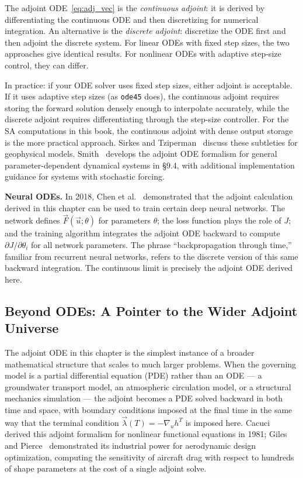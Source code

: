 The adjoint ODE~\eqref{eq:adj_vec} is the \emph{continuous adjoint}:
it is derived by differentiating the continuous ODE and then discretizing
for numerical integration. An alternative is the \emph{discrete adjoint}:
discretize the ODE first and then adjoint the discrete system.
For linear ODEs with fixed step sizes, the two approaches give
identical results. For nonlinear ODEs with adaptive step-size control,
they can differ.

In practice: if your ODE solver uses fixed step sizes, either adjoint
is acceptable. If it uses adaptive step sizes (as \texttt{ode45} does),
the continuous adjoint requires storing the forward solution densely
enough to interpolate accurately, while the discrete adjoint requires
differentiating through the step-size controller.
For the SA computations in this book, the continuous adjoint with
dense output storage is the more practical approach.
Sirkes and Tziperman~\cite{sirkes1997finite} discuss these subtleties
for geophysical models. Smith~\cite{smith2014uncertainty} develops the
adjoint ODE formalism for general parameter-dependent dynamical systems
in \S9.4, with additional implementation guidance for systems with
stochastic forcing.

\medskip
\noindent\textbf{Neural ODEs.}
In 2018, Chen et al.~\cite{chen2018neural} demonstrated that
the adjoint calculation derived in this chapter can be used to train
certain deep neural networks. The network defines $\vec{F}(\vec{u};\theta)$
for parameters $\theta$; the loss function plays the role of $J$;
and the training algorithm integrates the adjoint ODE backward
to compute $\partial J/\partial\theta_i$ for all network parameters.
The phrase ``backpropagation through time,'' familiar from recurrent
neural networks, refers to the discrete version of this same
backward integration. The continuous limit is precisely the adjoint
ODE derived here.

\subsection*{Beyond ODEs: A Pointer to the Wider Adjoint Universe}

The adjoint ODE in this chapter is the simplest instance of a
broader mathematical structure that scales to much larger problems.
When the governing model is a partial differential equation (PDE)
rather than an ODE --- a groundwater transport model, an atmospheric
circulation model, or a structural mechanics simulation --- the
adjoint becomes a PDE solved backward in both time and space,
with boundary conditions imposed at the final time in the same way
that the terminal condition $\vec{\lambda}(T) = -\nabla_u h^T$ is
imposed here.
Cacuci~\cite{cacuci1981sensitivity} derived this adjoint formalism
for nonlinear functional equations in 1981; Giles and
Pierce~\cite{giles2000introduction} demonstrated its industrial
power for aerodynamic design optimization, computing the sensitivity
of aircraft drag with respect to hundreds of shape parameters at the
cost of a single adjoint solve.

